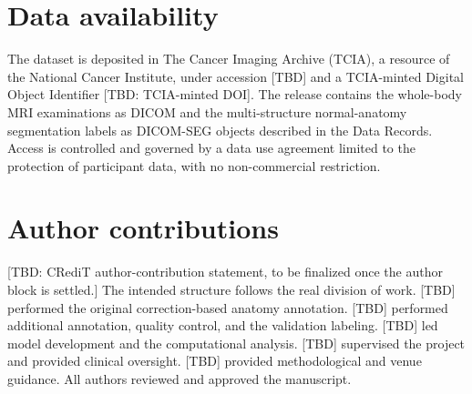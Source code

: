 \documentclass[pdflatex,sn-nature]{sn-jnl}%
\begin{document}










\backmatter



\section*{Data availability}\label{sec:dataavail}
The dataset is deposited in The Cancer Imaging Archive (TCIA), a resource of the National Cancer Institute, under accession [TBD] and a TCIA-minted Digital Object Identifier [TBD: TCIA-minted DOI].
The release contains the whole-body MRI examinations as DICOM and the multi-structure normal-anatomy segmentation labels as DICOM-SEG objects described in the Data Records.
Access is controlled and governed by a data use agreement limited to the protection of participant data, with no non-commercial restriction.






\section*{Author contributions}\label{sec:contrib}
[TBD: CRediT author-contribution statement, to be finalized once the author block is settled.]
The intended structure follows the real division of work.
[TBD] performed the original correction-based anatomy annotation.
[TBD] performed additional annotation, quality control, and the validation labeling.
[TBD] led model development and the computational analysis.
[TBD] supervised the project and provided clinical oversight.
[TBD] provided methodological and venue guidance.
All authors reviewed and approved the manuscript.
\end{document}
